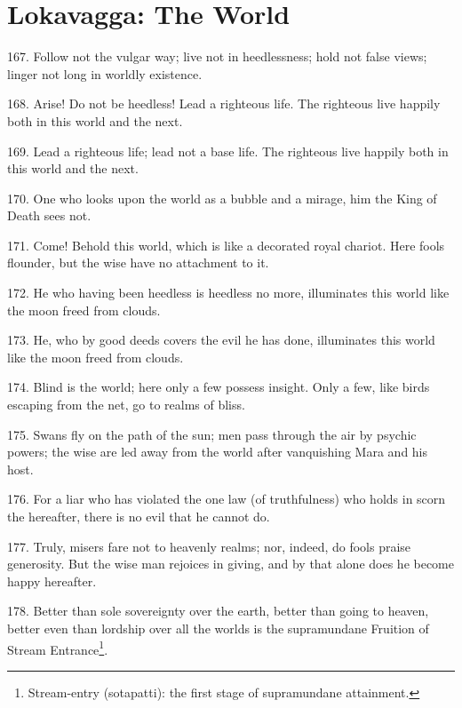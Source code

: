 \newpage
\chapter{Lokavagga: The World}
167. Follow not the vulgar way; live not in heedlessness; hold not false views; linger not long in worldly existence.

168. Arise! Do not be heedless! Lead a righteous life. The righteous live happily both in this world and the next.

169. Lead a righteous life; lead not a base life. The righteous live happily both in this world and the next.

170. One who looks upon the world as a bubble and a mirage, him the King of Death sees not.

171. Come! Behold this world, which is like a decorated royal chariot. Here fools flounder, but the wise have no attachment to it.

172. He who having been heedless is heedless no more, illuminates this world like the moon freed from clouds.

173. He, who by good deeds covers the evil he has done, illuminates this world like the moon freed from clouds.

174. Blind is the world; here only a few possess insight. Only a few, like birds escaping from the net, go to realms of bliss.

175. Swans fly on the path of the sun; men pass through the air by psychic powers; the wise are led away from the world after vanquishing Mara and his host.

176. For a liar who has violated the one law (of truthfulness) who holds in scorn the hereafter, there is no evil that he cannot do.

177. Truly, misers fare not to heavenly realms; nor, indeed, do fools praise generosity. But the wise man rejoices in giving, and by that alone does he become happy hereafter.

178. Better than sole sovereignty over the earth, better than going to heaven, better even than lordship over all the worlds is the supramundane Fruition of Stream Entrance\footnote{Stream-entry (sotapatti): the first stage of supramundane attainment.}.

